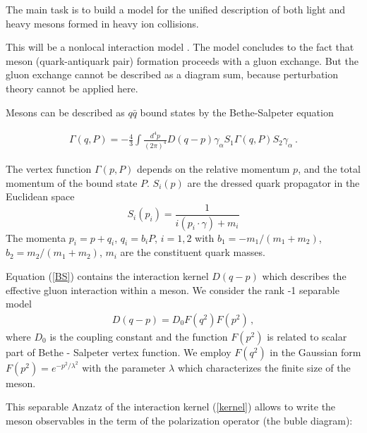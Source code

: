 \documentclass[%
]{ittmm}
\begin{document}
The main task is to build a model for the unified description of both light and heavy mesons formed in heavy ion collisions.

 This will be a nonlocal interaction model \cite{schmidt, costa}. 
 The model concludes to the fact that meson (quark-antiquark pair) formation proceeds with a gluon exchange. But the gluon exchange cannot be described as a diagram sum, because perturbation theory cannot be applied here. 
 
 Mesons can be described as $q\bar{q}$ bound states by 
the Bethe-Salpeter equation

\begin{eqnarray}\label{BS}
  \Gamma (q,P) = -\frac{4}{3} \int \frac{d^4 p}{(2\pi)^4}
  D(q-p) \gamma_\alpha S_1 \Gamma (q,P)
S_2 \gamma_\alpha \  .
\end{eqnarray}

The vertex function $\Gamma (p,P)$ depends on the relative
momentum $p$, and the total momentum of the bound state $P$. 
$S_i(p)$ are the dressed quark propagator in the Euclidean space 
\begin{equation}\label{Eqn:q_prop}
S_i(p_i)=\frac{1}{i (p_i\cdot \gamma) + m_i}
\end{equation}
The momenta $p_i=p+q_i$, $q_i = b_i P$, $i=1,2$ with 
$b_1 =- m_1/(m_1+m_2)$, $b_2 = m_2/(m_1+m_2)$, $m_i$ are the constituent quark masses. 

Equation (\ref{BS}) contains the interaction kernel $D(q-p)$ 
which describes the effective gluon interaction within a meson. 
We consider the rank -1 separable  model 
\begin{eqnarray}\label{kernel}
  D(q-p) = D_0 F(q^2) F(p^2) \, ,
\end{eqnarray}
where $D_0$ is the coupling constant and the function 
$F(p^2)$ is related to scalar part of Bethe - Salpeter  vertex
function. We employ  $F(q^2)$  in the Gaussian form 
$F(p^2)= e^{-p^2/\lambda^2}$ with the parameter $\lambda$ which  characterizes the finite size of the meson. 

This separable Anzatz of the interaction kernel (\ref{kernel}) allows to write the meson observables in the term of the polarization operator (the buble diagram): 


\end{document}
